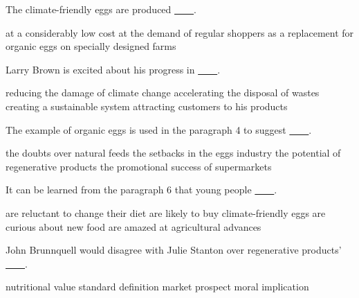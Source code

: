 \item The climate-friendly eggs are produced \uline{~~~~}.
\begin{tasks}
	\task at a considerably low cost
	\task at the demand of regular shoppers
	\task as a replacement for organic eggs
	\task on specially designed farms
\end{tasks}
\item Larry Brown is excited about his progress in \uline{~~~~}.
\begin{tasks}
	\task reducing the damage of climate change
	\task accelerating the disposal of wastes
	\task creating a sustainable system
	\task attracting customers to his products
\end{tasks}
\item The example of organic eggs is used in the paragraph 4 to suggest \uline{~~~~}.
\begin{tasks}
	\task the doubts over natural feeds
	\task the setbacks in the eggs industry
	\task the potential of regenerative products
	\task the promotional success of supermarkets
\end{tasks}
\item It can be learned from the paragraph 6 that young people \uline{~~~~}.
\begin{tasks}
	\task are reluctant to change their diet
	\task are likely to buy climate-friendly eggs
	\task are curious about new food
	\task are amazed at agricultural advances
\end{tasks}
\item John Brunnquell would disagree with Julie Stanton over regenerative products' \uline{~~~~}.
\begin{tasks}
	\task nutritional value
	\task standard definition
	\task market prospect
	\task moral implication
\end{tasks}
